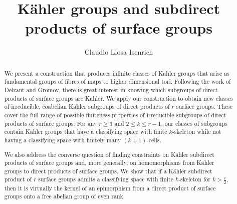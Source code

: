\documentclass[a4paper,11pt,reqno]{amsart}
\title{K\"ahler groups and subdirect products of surface groups}
\author{Claudio Llosa Isenrich}
\numberwithin{equation}{section}
\begin{document}


 
\begin{abstract}
We present a construction that produces infinite classes of K\"ahler groups that arise as fundamental groups of fibres of maps to higher dimensional tori. Following the work of Delzant and Gromov, there is great interest in knowing which subgroups of direct products of surface groups are K\"ahler.  We apply our construction to obtain new classes of irreducible, coabelian K\"ahler subgroups of direct products of $r$ surface groups. These cover the full range of possible finiteness properties of irreducible subgroups of direct products of surface groups: For any $r\geq 3$ and $2\leq k \leq r-1$, our classes of subgroups contain K\"ahler groups that have a classifying space with finite $k$-skeleton while not having a classifying space with finitely many $(k+1)$-cells. 

We also address the converse question of finding constraints on K\"ahler subdirect products of surface groups and, more generally, on homomorphisms from K\"ahler groups to direct products of surface groups. We show that if a K\"ahler subdirect product of $r$ surface groups admits a classifying space with finite $k$-skeleton for $k>\frac{r}{2}$, then it is virtually the kernel of an epimorphism from a direct product of surface groups onto a free abelian group of even rank.
\end{abstract}

\maketitle
















\end{document}
